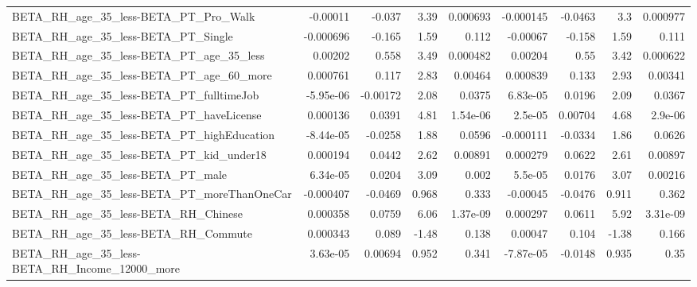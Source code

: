 \begin{tabular}{lrrrrrrrr}
BETA\_RH\_age\_35\_less-BETA\_PT\_Pro\_Walk               &    -0.00011 &       -0.037 &      3.39 & 0.000693 &  -0.000145 &     -0.0463 &          3.3 &      0.000977 \\
BETA\_RH\_age\_35\_less-BETA\_PT\_Single                 &   -0.000696 &       -0.165 &      1.59 &    0.112 &   -0.00067 &      -0.158 &         1.59 &         0.111 \\
BETA\_RH\_age\_35\_less-BETA\_PT\_age\_35\_less            &     0.00202 &        0.558 &      3.49 & 0.000482 &    0.00204 &        0.55 &         3.42 &      0.000622 \\
BETA\_RH\_age\_35\_less-BETA\_PT\_age\_60\_more            &    0.000761 &        0.117 &      2.83 &  0.00464 &   0.000839 &       0.133 &         2.93 &       0.00341 \\
BETA\_RH\_age\_35\_less-BETA\_PT\_fulltimeJob            &   -5.95e-06 &     -0.00172 &      2.08 &   0.0375 &   6.83e-05 &      0.0196 &         2.09 &        0.0367 \\
BETA\_RH\_age\_35\_less-BETA\_PT\_haveLicense            &    0.000136 &       0.0391 &      4.81 & 1.54e-06 &    2.5e-05 &     0.00704 &         4.68 &       2.9e-06 \\
BETA\_RH\_age\_35\_less-BETA\_PT\_highEducation          &   -8.44e-05 &      -0.0258 &      1.88 &   0.0596 &  -0.000111 &     -0.0334 &         1.86 &        0.0626 \\
BETA\_RH\_age\_35\_less-BETA\_PT\_kid\_under18            &    0.000194 &       0.0442 &      2.62 &  0.00891 &   0.000279 &      0.0622 &         2.61 &       0.00897 \\
BETA\_RH\_age\_35\_less-BETA\_PT\_male                   &    6.34e-05 &       0.0204 &      3.09 &    0.002 &    5.5e-05 &      0.0176 &         3.07 &       0.00216 \\
BETA\_RH\_age\_35\_less-BETA\_PT\_moreThanOneCar         &   -0.000407 &      -0.0469 &     0.968 &    0.333 &   -0.00045 &     -0.0476 &        0.911 &         0.362 \\
BETA\_RH\_age\_35\_less-BETA\_RH\_Chinese                &    0.000358 &       0.0759 &      6.06 & 1.37e-09 &   0.000297 &      0.0611 &         5.92 &      3.31e-09 \\
BETA\_RH\_age\_35\_less-BETA\_RH\_Commute                &    0.000343 &        0.089 &     -1.48 &    0.138 &    0.00047 &       0.104 &        -1.38 &         0.166 \\
BETA\_RH\_age\_35\_less-BETA\_RH\_Income\_12000\_more      &    3.63e-05 &      0.00694 &     0.952 &    0.341 &  -7.87e-05 &     -0.0148 &        0.935 &          0.35 \\

\end{tabular}
